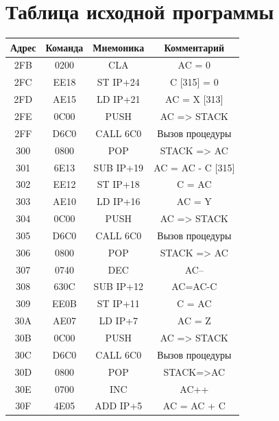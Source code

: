 \documentclass[14pt]{extreport}
\begin{document}
    \chapter{Таблица исходной программы}
        \begin{table}[h]

            \centering
            \begin{tabular}{|c|c|c|c|}
                \hline
                Адрес & Команда & Мнемоника & Комментарий \\ \hline \hline
                2FB & 0200 & CLA        & AC = 0\\ \hline
                2FC & EE18 & ST IP+24   & C [315] = 0\\ \hline
                2FD & AE15 & LD IP+21   & AC = X [313]\\ \hline
                2FE & 0C00 & PUSH       & AC => STACK \\ \hline
                2FF & D6C0 & CALL 6C0   & Вызов процедуры\\ \hline
                300 & 0800 & POP        & STACK => AC\\ \hline
                301 & 6E13 & SUB IP+19  & AC = AC - C [315]\\ \hline
                302 & EE12 & ST IP+18   & C = AC \\ \hline
                303 & AE10 & LD IP+16   & AC = Y \\ \hline
                304 & 0C00 & PUSH       & AC => STACK\\ \hline
                305 & D6C0 & CALL 6C0   & Вызов процедуры\\ \hline
                306 & 0800 & POP        & STACK => AC\\ \hline
                307 & 0740 & DEC        & AC--\\ \hline
                308 & 630C & SUB IP+12  & AC=AC-C\\ \hline
                309 & EE0B & ST IP+11   & C = AC\\ \hline
                30A & AE07 & LD IP+7    & AC = Z\\ \hline
                30B & 0C00 & PUSH       & AC => STACK\\ \hline
                30C & D6C0 & CALL 6C0   & Вызов процедуры\\ \hline
                30D & 0800 & POP        & STACK=>AC\\ \hline
                30E & 0700 & INC        & AC++\\ \hline
                30F & 4E05 & ADD IP+5   & AC = AC + C\\ \hline

\end{tabular}
\end{table}
\end{document}
